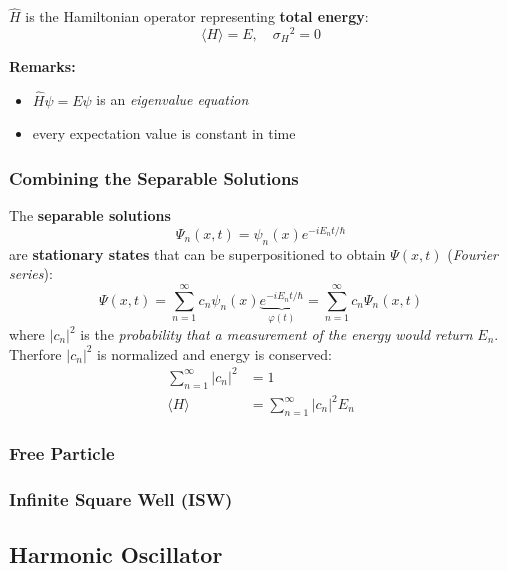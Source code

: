 
$\widehat{H}$ is the Hamiltonian operator representing \textbf{total energy}:
\noindent\begin{equation*}
    \langle H\rangle = E,\quad{\sigma_H}^2 = 0
\end{equation*}

\textbf{Remarks:}
\begin{itemize}
    \item $\widehat{H}\psi = E\psi$ is an \textit{eigenvalue equation}
    \item every expectation value is constant in time
\end{itemize}




\subsubsection{Combining the Separable Solutions}
The \textbf{separable solutions}
\noindent\begin{equation*}
    \Psi_n(x,t)=\psi_n(x)e^{-iE_n t/\hbar}
\end{equation*}
are \textbf{stationary states} that can be superpositioned to obtain $\Psi(x,t)$ (\textit{Fourier series}):
\noindent\begin{equation*}
    \Psi(x,t) =\sum_{n=1}^\infty c_n\psi_n(x) \underbrace{e^{-iE_n t/\hbar}}_{\varphi(t)}=\sum_{n=1}^\infty c_n\Psi_n(x,t)
\end{equation*}
where $|c_n|^2$ is the \textit{probability that a measurement of the energy would return} $E_n$. Therfore $|c_n|^2$ is normalized and energy is conserved:
\noindent\begin{align*}
    \sum_{n=1}^\infty|c_n|^2 & =1                           \\
    \langle H\rangle         & =\sum_{n=1}^\infty|c_n|^2E_n
\end{align*}

\subsubsection{Free Particle}

\subsubsection{Infinite Square Well (ISW)}

\subsection{Harmonic Oscillator}
